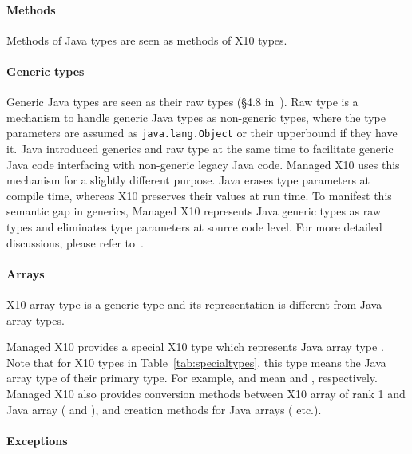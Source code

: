 \paragraph{Methods}

Methods of Java types are seen as methods of X10 types.

\paragraph{Generic types}

Generic Java types are seen as their raw types 
(\S 4.8 in~\cite{java-lang-spec2005}).  Raw type is a mechanism to handle generic
Java types as non-generic types, where the type parameters are assumed
as \verb|java.lang.Object| or their upperbound if they have it.  Java
introduced generics and raw type at the same time to facilitate
generic Java code interfacing with non-generic legacy Java code.
Managed X10 uses this mechanism for a slightly different purpose.
Java erases type parameters at compile time, whereas X10 preserves
their values at run time.  To manifest this semantic gap in generics,
Managed X10 represents Java generic types as raw types and eliminates
type parameters at source code level.  For more detailed discussions,
please refer to~\cite{TakeuchiX1011,TakeuchiX1012}.

\paragraph{Arrays}

X10 array type is a generic type and its representation is different
from Java array types.

Managed X10 provides a special X10 type
 which represents Java array type
.  Note that for X10 types in Table~\ref{tab:specialtypes},
this type means the Java array type of their primary type.  For
example,  and  mean
 and , respectively.  Managed X10
also provides conversion methods between X10 array of rank 1 and Java
array ( and
), and creation
methods for Java arrays (
etc.).

\paragraph{Exceptions}


